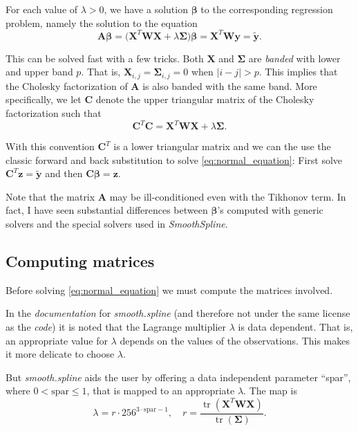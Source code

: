 \documentclass[a4paper]{scrartcl}
\newcommand{\vv}[1]{\ensuremath{\bm{#1}}}
\newcommand{\mat}[1]{\ensuremath{\bm{#1}}}
\newcommand{\T}[1]{\ensuremath{{#1}^{T}}}
\DeclareMathOperator\tr{tr}
\begin{document}
For each value of $\lambda > 0$, we have a solution $\vv\beta$ to the corresponding regression problem, namely the solution to the equation
\begin{equation}
    \label{eq:normal_equation}
    \mat A \vv \beta
    = \bigl(\T{\mat X} \mat W \mat X + \lambda \mat\Sigma\bigr) \vv\beta
    = \T{\mat X} \mat W \vv y 
    = \widetilde{\vv y}.
\end{equation}

This can be solved fast with a few tricks.
Both $\mat X$ and $\mat\Sigma$ are \textit{banded} with lower and upper band $p$.
That is, $\mat X_{i,j} = \mat\Sigma_{i,j} = 0$ when $|i - j| > p$.
This implies that the Cholesky factorization of $\mat A$ is also banded with the same band.
More specifically, we let $\mat C$ denote the upper triangular matrix of the Cholesky factorization such that 
\begin{equation*}
    \T{\mat C} \mat C = \T{\mat X} \mat W \mat X + \lambda \mat\Sigma.
\end{equation*}

With this convention $\T{\mat C}$ is a lower triangular matrix and we can the use the classic forward and back substitution to solve \cref{eq:normal_equation}:
First solve $\T{\mat C} \vv z = \widetilde{\vv y}$ and then $\mat C \vv \beta = \vv z$.

Note that the matrix $\mat A$ may be ill-conditioned even with the Tikhonov term.
In fact, I have seen substantial differences between $\vv\beta$'s computed with generic solvers and the special solvers used in \textit{SmoothSpline}.


\subsection{Computing matrices}

Before solving \cref{eq:normal_equation} we must compute the matrices involved.

In the \textit{documentation} for \textit{smooth.spline} (and therefore not under the same license as the \textit{code}) it is noted that the Lagrange multiplier $\lambda$ is data dependent.
That is, an appropriate value for $\lambda$ depends on the values of the observations.
This makes it more delicate to choose $\lambda$.

But \textit{smooth.spline} aids the user by offering a data independent parameter \enquote{spar}, where $0 < \text{spar} \leq 1$, that is mapped to an appropriate $\lambda$.
The map is
\begin{equation*}
    \lambda = r\cdot 256^{3\cdot\text{spar} - 1},
    \quad
    r = \frac{\tr(\T{\mat X} \mat W \mat X)}{\tr(\mat\Sigma)}.
\end{equation*}
\end{document}
